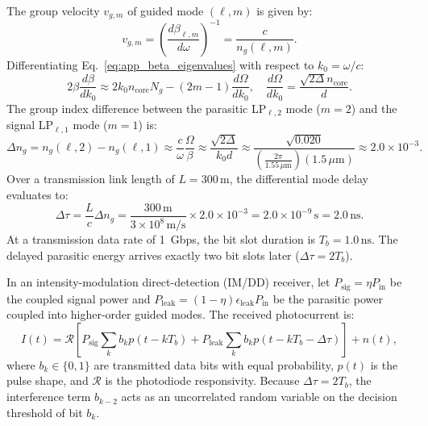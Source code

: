 \documentclass{optica-article}
\begin{document}
The group velocity $v_{g, m}$ of guided mode $(\ell, m)$ is given by:
\begin{equation}
v_{g, m} = \left( \frac{d\beta_{\ell, m}}{d\omega} \right)^{-1} = \frac{c}{n_g(\ell, m)}.
\label{eq:app_group_velocity}
\end{equation}
Differentiating Eq.~\eqref{eq:app_beta_eigenvalues} with respect to $k_0 = \omega / c$:
\begin{equation}
2\beta \frac{d\beta}{dk_0} \approx 2 k_0 n_{\text{core}} N_g - (2m - 1) \frac{d\Omega}{dk_0}, \quad \frac{d\Omega}{dk_0} = \frac{\sqrt{2\Delta} n_{\text{core}}}{d}.
\label{eq:app_beta_derivative}
\end{equation}
The group index difference between the parasitic LP$_{\ell, 2}$ mode ($m=2$) and the signal LP$_{\ell, 1}$ mode ($m=1$) is:
\begin{equation}
\Delta n_g = n_g(\ell, 2) - n_g(\ell, 1) \approx \frac{c}{\omega} \frac{\Omega}{\beta} \approx \frac{\sqrt{2\Delta}}{k_0 d} \approx \frac{\sqrt{0.020}}{\left( \frac{2\pi}{1.55\,\mu\text{m}} \right) (1.5\,\mu\text{m})} \approx 2.0 \times 10^{-3}.
\label{eq:app_delta_ng_eval}
\end{equation}
Over a transmission link length of $L = 300\,\text{m}$, the differential mode delay evaluates to:
\begin{equation}
\Delta \tau = \frac{L}{c} \Delta n_g = \frac{300\,\text{m}}{3 \times 10^8\,\text{m/s}} \times 2.0 \times 10^{-3} = 2.0 \times 10^{-9}\,\text{s} = 2.0\,\text{ns}.
\label{eq:app_dmd_result}
\end{equation}
At a transmission data rate of 1~Gbps, the bit slot duration is $T_b = 1.0\,\text{ns}$. The delayed parasitic energy arrives exactly two bit slots later ($\Delta \tau = 2 T_b$).

In an intensity-modulation direct-detection (IM/DD) receiver, let $P_{\text{sig}} = \eta P_{\text{in}}$ be the coupled signal power and $P_{\text{leak}} = (1 - \eta) \epsilon_{\text{leak}} P_{\text{in}}$ be the parasitic power coupled into higher-order guided modes. The received photocurrent is:
\begin{equation}
I(t) = \mathcal{R} \left[ P_{\text{sig}} \sum_k b_k p(t - k T_b) + P_{\text{leak}} \sum_k b_k p(t - k T_b - \Delta \tau) \right] + n(t),
\label{eq:app_photocurrent}
\end{equation}
where $b_k \in \{0, 1\}$ are transmitted data bits with equal probability, $p(t)$ is the pulse shape, and $\mathcal{R}$ is the photodiode responsivity. Because $\Delta \tau = 2 T_b$, the interference term $b_{k-2}$ acts as an uncorrelated random variable on the decision threshold of bit $b_k$.
\end{document}
